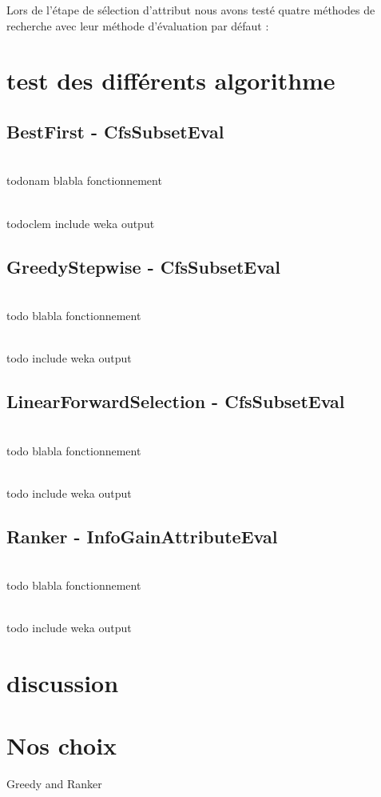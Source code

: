 Lors de l'étape de sélection d'attribut nous avons testé quatre méthodes de recherche avec leur méthode d'évaluation par défaut :

\section{test des différents algorithme}

\subsection{BestFirst - CfsSubsetEval}

\\todo{nam} blabla fonctionnement

\\todo{clem} include weka output

\subsection{GreedyStepwise - CfsSubsetEval}

\\todo blabla fonctionnement


\\todo include weka output


\subsection{LinearForwardSelection - CfsSubsetEval}

\\todo blabla fonctionnement


\\todo include weka output


\subsection{Ranker - InfoGainAttributeEval}

\\todo blabla fonctionnement


\\todo include weka output

\section{discussion}


\section{Nos choix}

Greedy and Ranker